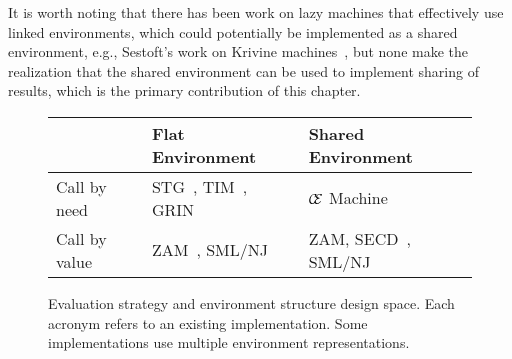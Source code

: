 It is worth noting that there has been work on lazy machines that effectively use
linked environments, which could potentially be implemented as a shared
environment, e.g., Sestoft's work on Krivine machines~\cite{sestoft}, but none
make the realization that the shared environment can be used to implement
sharing of results, which is the primary contribution of this chapter.

\begin{figure}
\begin{tabularx}{\textwidth}{l | X | X}
                & Flat Environment     & Shared Environment \\ \hline
  Call by need  & STG~\cite{jonesstg}, 
                  TIM~\cite{TIM}, 
                  GRIN~\cite{boquist1997grin} 
                & $\mathcal{\mathcal{C} \mskip -4mu \mathcal{E}}$ Machine \\
  Call by value & ZAM~\cite{leroy1990zinc}, 
                  SML/NJ~\cite{appel1991standard}
                & ZAM,
                  SECD~\cite{landin1964mechanical}, 
                  SML/NJ \\
\end{tabularx}
\caption{Evaluation strategy and environment structure design space. Each
acronym refers to an existing implementation. Some implementations use multiple
environment representations.}
\label{fig:designspace}
\end{figure}

